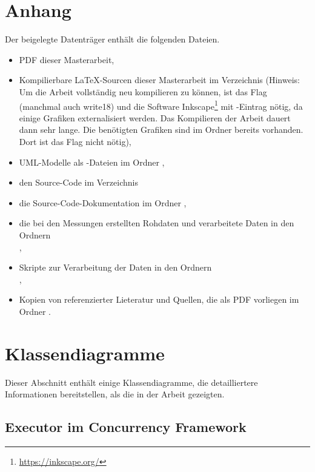 \appendix
\clearpage
\renewcommand{\sectionmark}[1]{\markboth{\Ifnumbered{section}{Anhang \thesection}{}}{#1}}
\setcounter{page}{1}

\section*{Anhang}
{}

Der beigelegte Datenträger enthält die folgenden Dateien.

\begin{itemize}
	\item PDF dieser Masterarbeit,
	\item Kompilierbare \LaTeX-Sourcen dieser Masterarbeit im Verzeichnis  (Hinweis: Um die Arbeit vollständig neu kompilieren zu können, ist das Flag  (manchmal auch write18) und die Software Inkscape\footnote{\url{https://inkscape.org/}} mit -Eintrag nötig, da einige Grafiken externalisiert werden. Das Kompilieren der Arbeit dauert dann sehr lange. Die benötigten Grafiken sind im Ordner  bereits vorhanden. Dort ist das Flag nicht nötig),
	\item UML-Modelle als -Dateien im Ordner ,
	\item den Source-Code im Verzeichnis 
	\item die Source-Code-Dokumentation im Ordner ,
	\item die bei den Messungen erstellten Rohdaten und verarbeitete Daten in den Ordnern\\ ,
	\item Skripte zur Verarbeitung der Daten in den Ordnern\\ ,
	\item Kopien von referenzierter Lieteratur und Quellen, die als PDF vorliegen im Ordner .
\end{itemize}

\clearpage
\section{Klassendiagramme}
Dieser Abschnitt enthält einige Klassendiagramme, die detailliertere Informationen bereitstellen, als die in der Arbeit gezeigten.
\subsection{Executor im Concurrency Framework}\label{appendix:concFrameworkExecutor}


